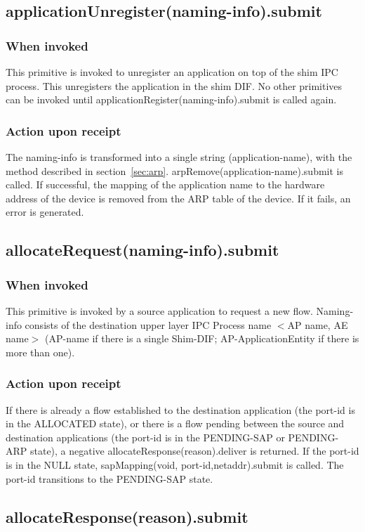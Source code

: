 \subsection{applicationUnregister(naming-info).submit}
\subsubsection{When invoked}
This primitive is invoked to unregister an application on top of the shim IPC process. This unregisters the application in the shim DIF. No other primitives can be invoked until applicationRegister(naming-info).submit is called again. 
\subsubsection{Action upon receipt}
The naming-info is transformed into a single string (application-name), with the method described in section~\ref{sec:arp}. arpRemove(application-name).submit is called. If successful, the mapping of the application name to the hardware address of the device is removed from the ARP table of the device. If it fails, an error is generated.


\subsection{allocateRequest(naming-info).submit}
\subsubsection{When invoked}
This primitive is invoked by a source application to request a new flow. Naming-info consists of the destination upper layer IPC Process name $<$AP name, AE name$>$ (AP-name if there is a single Shim-DIF; AP-ApplicationEntity if there is more than one).
\subsubsection{Action upon receipt}
If there is already a flow established to the destination application (the port-id is in the ALLOCATED state), or there is a flow pending between the source and destination applications (the port-id is in the PENDING-SAP or PENDING-ARP state), a negative allocateResponse(reason).deliver is returned. If the port-id is in the NULL state, sapMapping(void, port-id,netaddr).submit is called. The port-id transitions to the PENDING-SAP state.


\subsection{allocateResponse(reason).submit}
